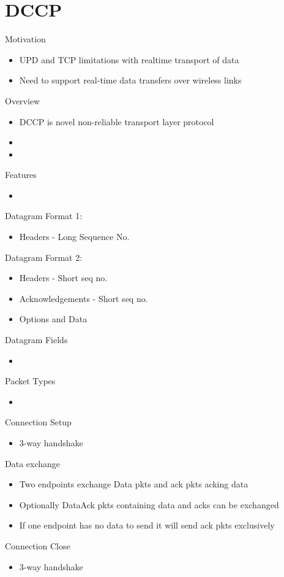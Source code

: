 \section{DCCP}
Motivation
\begin{itemize}
	\item UPD and TCP limitations with realtime transport of data
	\item Need to support real-time data transfers over wireless links
\end{itemize}
Overview
\begin{itemize}
	\item DCCP is novel non-reliable transport layer protocol
	\item
	\item
\end{itemize}
Features
\begin{itemize}
	\item
\end{itemize}
Datagram Format 1:
\begin{itemize}
	\item Headers - Long Sequence No.
\end{itemize}
Datagram Format 2:
\begin{itemize}
	\item Headers - Short seq no.
	\item Acknowledgements - Short seq no.
	\item Options and Data
\end{itemize}
Datagram Fields
\begin{itemize}
	\item
\end{itemize}
Packet Types
\begin{itemize}
	\item
\end{itemize}
Connection Setup
\begin{itemize}
	\item 3-way handshake
\end{itemize}
Data exchange
\begin{itemize}
	\item Two endpoints exchange Data pkts and ack pkts acking data
	\item Optionally DataAck pkts containing data and acks can be exchanged
	\item If one endpoint has no data to send it will send ack pkts
		exclusively
\end{itemize}
Connection Close
\begin{itemize}
	\item 3-way handshake
\end{itemize}
